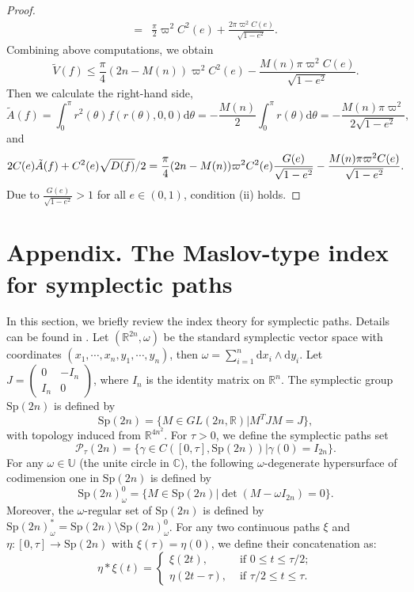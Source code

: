 \documentclass[11pt]{amsart}
\newcommand{\om}{\varpi}
\begin{document}
\begin{proof}
\begin{equation*}
\begin{aligned}
		=&\frac{\pi}{2}\om^2C^2(e)+\frac{2\pi\om^2C(e)}{\sqrt{1-e^2}}.
	\end{aligned}
\end{equation*}
Combining above computations, we obtain
\begin{equation*}
	\tilde{V}(f)\leq\frac{\pi}{4}(2n-M(n))\om^2C^2(e)-\frac{M(n)\pi\om^2C(e)}{\sqrt{1-e^2}}.
\end{equation*}
Then we calculate the right-hand side,
	\begin{equation*}
			\tilde{A}(f)=\int_{0}^{\pi}r^{2}(\theta)f(r(\theta),0,0)\mathrm{d}\theta=-\frac{M(n)}{2}\int_{0}^{\pi}r(\theta)\mathrm{d}\theta
			=-\frac{M(n)\pi\om^{2}}{2\sqrt{1-e^{2}}},
	\end{equation*}
and
	\begin{equation*}
			2C(e)\tilde{A}(f)+C^2(e)\sqrt{D(f)}\slash2\\
			=\frac{\pi}{4}(2n-M(n))\om^{2}C^2(e)\frac{G(e)}{\sqrt{1-e^2}}-\frac{M(n)\pi\om^{2}C(e)}{\sqrt{1-e^{2}}}.		
	\end{equation*}
	Due to $\frac{G(e)}{\sqrt{1-e^2}}>1$ for all $e\in(0,1)$, condition (ii) holds.
\end{proof}

\section{Appendix. The Maslov-type index for symplectic paths}

In this section, we briefly review the index theory for symplectic paths. Details can be found in \cite{Lon02}. Let $(\mathbb{R}^{2n},\omega)$ be the standard symplectic vector space with coordinates $(x_1,\cdots,x_n,y_1,\cdots,y_n)$, then $\omega=\sum_{i=1}^{n}\mathrm{d}x_i\wedge\mathrm{d}y_i$. Let $J=\begin{pmatrix}
	0 & -I_n\\
	I_n & 0
\end{pmatrix}$, where $I_n$ is the identity matrix on $\mathbb{R}^n$. The symplectic group $\text{Sp}(2n)$ is defined by
$$\text{Sp}(2n)=\{M\in GL(2n,\mathbb{R})\big|M^TJM=J\},
$$
with topology induced from $\mathbb{R}^{4n^2}$. For $\tau>0$, we define the symplectic paths set
$$\mathcal{P}_\tau(2n)=\{\gamma\in C([0,\tau],\text{Sp}(2n))\big|\gamma(0)=I_{2n}\}.
$$
For any $\omega\in\mathbb{U}$ (the unite circle in $\mathbb{C}$), the following $\omega$-degenerate hypersurface of codimension one in $\text{Sp}(2n)$ is defined by
$$\text{Sp}(2n)_\omega^0=\{M\in\text{Sp}(2n)\big|\det(M-\omega I_{2n})=0\}.
$$
Moreover, the $\omega$-regular set of $\text{Sp}(2n)$ is defined by $\text{Sp}(2n)_\omega^*=\text{Sp}(2n)\setminus\text{Sp}(2n)_\omega^0$. For any two continuous paths $\xi$ and $\eta:[0,\tau]\rightarrow\text{Sp}(2n)$ with $\xi(\tau)=\eta(0)$, we define their concatenation as:
$$\eta*\xi(t)=\begin{cases}
	\xi(2t), & \text{ if } 0\leq t\leq\tau/2;\\
	\eta(2t-\tau), & \text{ if } \tau/2\leq t\leq \tau.
\end{cases}
$$
\end{document}
